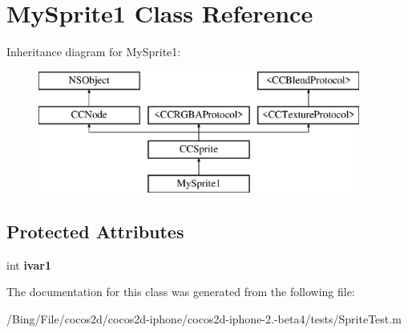 \hypertarget{interface_my_sprite1}{\section{My\-Sprite1 Class Reference}
\label{interface_my_sprite1}
}
Inheritance diagram for My\-Sprite1\-:\begin{figure}[H]
\begin{center}
\leavevmode
\includegraphics[height=4.000000cm]{interface_my_sprite1}
\end{center}
\end{figure}
\subsection*{Protected Attributes}
\begin{DoxyCompactItemize}
\item 
\hypertarget{interface_my_sprite1_a28e249d701413ca9e54778b27fc4ea99}{int {\bfseries ivar1}}\label{interface_my_sprite1_a28e249d701413ca9e54778b27fc4ea99}

\end{DoxyCompactItemize}


The documentation for this class was generated from the following file\-:\begin{DoxyCompactItemize}
\item 
/\-Bing/\-File/cocos2d/cocos2d-\/iphone/cocos2d-\/iphone-\/2.-\/beta4/tests/Sprite\-Test.\-m\end{DoxyCompactItemize}
